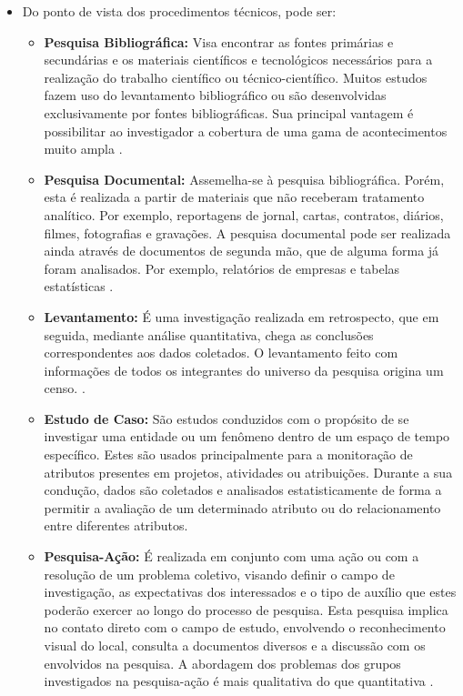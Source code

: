 \begin{itemize}
	\item Do ponto de vista dos procedimentos técnicos, pode ser:
		\begin{itemize}
			\item \textbf{Pesquisa Bibliográfica:} Visa encontrar as fontes primárias e secundárias e os materiais científicos e tecnológicos necessários para a realização do trabalho científico ou técnico-científico. Muitos estudos fazem uso do levantamento bibliográfico ou são desenvolvidas exclusivamente por fontes bibliográficas. Sua principal vantagem é possibilitar ao investigador a cobertura de uma gama de acontecimentos muito ampla \cite{Silva:Tafner:2007}.

			\item \textbf{Pesquisa Documental:} Assemelha-se à pesquisa bibliográfica. Porém, esta é realizada a partir de materiais que não receberam tratamento analítico. Por exemplo, reportagens de jornal, cartas, contratos, diários, filmes, fotografias e gravações. A pesquisa documental pode ser realizada ainda através de documentos de segunda mão, que de alguma forma já foram analisados. Por exemplo, relatórios de empresas e tabelas estatísticas \cite{Gil:2010}.

			\item \textbf{Levantamento:} É uma investigação realizada em retrospecto, que em seguida, mediante análise quantitativa, chega as conclusões correspondentes aos dados coletados. O levantamento feito com informações de todos os integrantes do universo da pesquisa origina um censo. \cite{Mafra:Travassos:2006}.
			
			\item \textbf{Estudo de Caso:} São estudos conduzidos com o propósito de se investigar uma entidade ou um fenômeno dentro de um espaço de tempo específico. Estes são usados principalmente para a monitoração de atributos presentes em projetos, atividades ou atribuições. Durante a sua condução, dados são coletados e analisados estatisticamente de forma a permitir a avaliação de um determinado atributo ou do relacionamento entre diferentes atributos. \cite{Mafra:Travassos:2006}
			
			\item \textbf{Pesquisa-Ação:} É realizada em conjunto com uma ação ou com a resolução de um problema coletivo, visando definir o campo de investigação, as expectativas dos interessados e o tipo de auxílio que estes poderão exercer ao longo do processo de pesquisa. Esta pesquisa implica no contato direto com o campo de estudo, envolvendo o reconhecimento visual do local, consulta a documentos diversos e a discussão com os envolvidos na pesquisa. A abordagem dos problemas dos grupos investigados na pesquisa-ação é mais qualitativa do que quantitativa \cite{Silva:Tafner:2007}.
			

\end{itemize}
\end{itemize}
